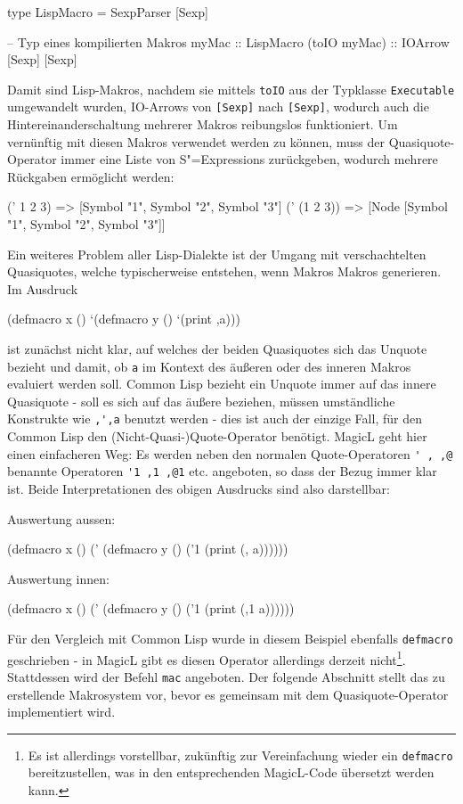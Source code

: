 \documentclass[11pt, a4paper, bibgerm]{scrbook}
\newcommand\icode[1]{\lstinline?#1?}
\newcommand{\sexps}{S"=Expressions}
\begin{document}
\begin{code}
type LispMacro = SexpParser [Sexp]

-- Typ eines kompilierten Makros
myMac        :: LispMacro
(toIO myMac) :: IOArrow [Sexp] [Sexp]
\end{code}
Damit sind Lisp-Makros, nachdem sie mittels \icode{toIO} aus der Typklasse
\icode{Executable} umgewandelt wurden, IO-Arrows von \icode{[Sexp]} nach
\icode{[Sexp]}, wodurch auch die Hintereinanderschaltung mehrerer
Makros reibungslos funktioniert. Um vernünftig mit diesen Makros
verwendet werden zu können, muss der Quasiquote-Operator immer eine
Liste von \sexps{} zurückgeben, wodurch mehrere Rückgaben ermöglicht
werden:
\begin{code}
(' 1 2 3)     =>   [Symbol "1", Symbol "2", Symbol "3"]
(' (1 2 3))   =>   [Node [Symbol "1", Symbol "2", Symbol "3"]]
\end{code}
Ein weiteres Problem aller Lisp-Dialekte ist der Umgang mit
verschachtelten Quasiquotes, welche typischerweise entstehen, wenn
Makros Makros generieren. Im Ausdruck
\begin{code}
(defmacro x ()
  `(defmacro y ()
     `(print ,a)))
\end{code}
ist zunächst nicht klar, auf welches der beiden Quasiquotes sich das Unquote
bezieht und damit, ob \icode{a} im Kontext des äußeren oder des inneren
Makros evaluiert werden soll. Common Lisp bezieht ein Unquote immer auf
das innere Quasiquote - soll es sich auf das äußere beziehen, müssen
umständliche Konstrukte wie \icode{,',a} benutzt werden - dies ist auch
der einzige Fall, für den Common Lisp den (Nicht-Quasi-)Quote-Operator
benötigt. MagicL geht hier einen einfacheren Weg: Es werden neben den
normalen Quote-Operatoren \icode{' , ,@} benannte
Operatoren \icode{'1 ,1 ,@1} etc. angeboten,
so dass der Bezug immer klar ist. Beide Interpretationen des obigen
Ausdrucks sind also darstellbar:
\begin{code}
Auswertung aussen:

(defmacro x ()
  (' (defmacro y ()
       ('1 (print (, a))))))


Auswertung innen:

(defmacro x ()
  (' (defmacro y ()
       ('1 (print (,1 a))))))
\end{code}
Für den Vergleich mit Common Lisp wurde in diesem Beispiel ebenfalls
\icode{defmacro} geschrieben - in MagicL gibt es diesen Operator
allerdings derzeit nicht\footnote{Es ist allerdings vorstellbar,
  zukünftig zur Vereinfachung wieder ein \icode{defmacro}
  bereitzustellen, was in den entsprechenden MagicL-Code übersetzt
  werden kann.}. Stattdessen wird der Befehl \icode{mac} angeboten. Der
folgende Abschnitt stellt das zu erstellende Makrosystem vor, bevor es
gemeinsam mit dem Quasiquote-Operator implementiert wird.
\end{document}
